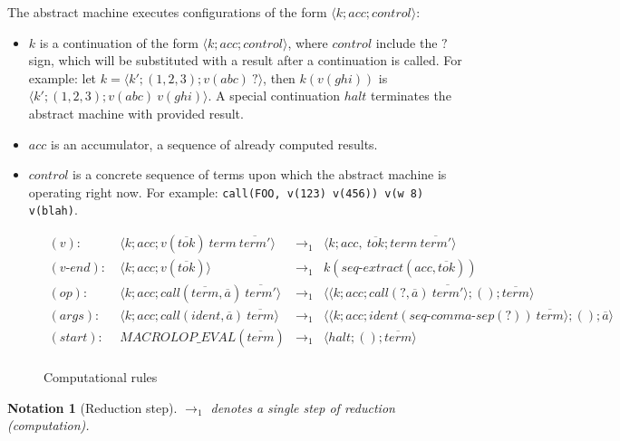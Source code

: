 \documentclass[a4paper, 12pt]{article}
\newtheorem{notation}{Notation}
\begin{document}
The abstract machine executes configurations of the form $\langle k; acc; control \rangle$:

\begin{itemize}
    \item $k$ is a continuation of the form $\langle k; acc; control \rangle$, where
    $control$ include the $?$ sign, which will be substituted with a result after a
    continuation is called. For example: let $k = \langle k'; (1, 2, 3); v(abc) \ ? \rangle$,
    then $k(v(ghi))$ is $\langle k'; (1, 2, 3); v(abc) \ v(ghi) \rangle$. A special
    continuation $halt$ terminates the abstract machine with provided result.

    \item $acc$ is an accumulator, a sequence of already computed results.

    \item $control$ is a concrete sequence of terms upon which the abstract machine is
    operating right now. For example: \texttt{call(FOO, v(123) v(456)) v(w 8) v(blah)}.
\end{itemize}

\begin{figure}[H]
    \caption{Computational rules}

    \begin{align*}
        (v): \ & \langle k; acc; v(\overline{tok}) \ term \ \overline{term'} \rangle & \to_1 &
            \langle k; acc, \ \overline{tok}; term \ \overline{term'} \rangle \\
        (v\mbox{-}end): \ & \langle k; acc; v(\overline{tok}) \rangle & \to_1 &
            k(seq\mbox{-}extract(acc, \overline{tok})) \\
        (op): \ & \langle k; acc; call(\overline{term}, \overline{a}) \ \overline{term'} \rangle & \to_1 &
            \langle \langle k; acc; call(?, \overline{a}) \ \overline{term'} \rangle; (); \overline{term} \rangle \\
        (args): \ & \langle k; acc; call(ident, \overline{a}) \ \overline{term} \rangle & \to_1 &
            \langle \langle k; acc; ident(seq\mbox{-}comma\mbox{-}sep(?)) \ \overline{term} \rangle; (); \overline{a} \rangle \\
        (start): \ & MACROLOP\_EVAL(\overline{term}) & \to_1 &
            \langle halt; (); \overline{term} \rangle \\
    \end{align*}
\end{figure}

\begin{notation}[Reduction step]
    $\to_1$ denotes a single step of reduction (computation).
\end{notation}
\end{document}
